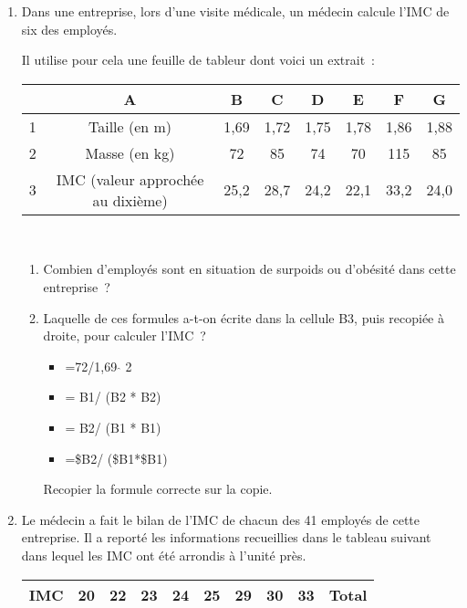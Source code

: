 \begin{enumerate}
     \item  Dans une entreprise, lors d'une visite médicale, un médecin calcule l'IMC de six des employés.
     \par
     Il utilise pour cela une feuille de tableur dont voici un extrait~:
     \begin{center}
          \begin{tabular}{|c|c|c|c|c|c|c|c|}\hline%
               &A				&B 		&C 		&D 		&E 		&F 		&G\\ \hline
               1	&Taille (en m) 	&1,69 	&1,72 	&1,75 	&1,78 	&1,86 	&1,88\\ \hline
               2	&Masse (en kg) 	&72 	&85 	&74 	&70 	&115 	&85\\ \hline
               3	&IMC (valeur approchée au dixième)		&25,2 	&28,7 	&24,2 	&22,1 	&33,2 	&24,0\\ \hline
          \end{tabular}\\
     \end{center}
     \begin{enumerate}[label=\alph*.]
          \item Combien d'employés sont en situation de surpoids ou d'obésité dans cette entreprise~?
          \item Laquelle de ces formules a-t-on écrite dans la cellule B3, puis recopiée à droite, pour calculer l'IMC~?
          \begin{itemize}
               \item %
               =72/1,69 $\hat{}$ 2
               \item %
               = B1/ (B2 * B2)
               \item %
               = B2/ (B1 * B1)
               \item %
               =\$B2/ (\$B1*\$B1)
          \end{itemize}
          Recopier la formule correcte sur la copie.
          \medbreak
     \end{enumerate}
     \item Le médecin a fait le bilan de l'IMC de chacun des 41 employés de cette entreprise. Il a reporté les
     informations recueillies dans le tableau suivant dans lequel les IMC ont été arrondis à l'unité près.
     \begin{center}
          \begin{tabular}{|c|c|c|c|c|c|c|c|c|c|}\hline%
               IMC &20 &22 &23 &24 &25 &29 &30 &33 &Total\\ \hline

\end{tabular}
\end{center}
\end{enumerate}
